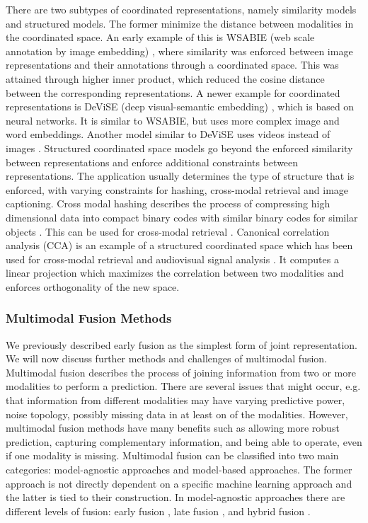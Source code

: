 \documentclass{article}
\begin{document}
There are two subtypes of coordinated representations, namely similarity models and structured models. The former minimize the distance between modalities in the coordinated space. An early example of this is WSABIE (web scale annotation by image embedding) \citep{weston2011wsabie}, where similarity was enforced between image representations and their annotations through a coordinated space. This was attained through higher inner product, which reduced the cosine distance between the corresponding representations. A newer example for coordinated representations is DeViSE (deep visual-semantic embedding) \citep{frome2013devise}, which is based on neural networks. It is similar to WSABIE, but uses more complex image and word embeddings. Another model similar to DeViSE uses videos instead of images \citep{pan2016joint}.
Structured coordinated space models go beyond the enforced similarity between representations and  enforce additional constraints between representations. The application usually determines the type of structure that is enforced, with varying constraints for hashing, cross-modal retrieval and image captioning. Cross modal hashing describes the process of compressing high dimensional data into compact binary codes with similar binary codes for similar objects \citep{wang2014hashing}. This can be used for cross-modal retrieval \citep{bronstein2010data, jiang2015class}. Canonical correlation analysis (CCA) \citep{hotelling1936relations} is an example of a structured coordinated space which has been used for cross-modal retrieval \citep{hardoon2004canonical, klein2015associating, Rasiwasia2010ANA} and audiovisual signal analysis \citep{sargin2007audio, slaney2001facesync}. It computes a linear projection which maximizes the correlation between two modalities and enforces orthogonality of the new space.

\subsubsection{Multimodal Fusion Methods}

We previously described early fusion as the simplest form of joint representation. We will now discuss further methods and challenges of multimodal fusion. Multimodal fusion describes the process of joining information from two or more modalities to perform a prediction. There are several issues that might occur, e.g. that information from different modalities may have varying predictive power, noise topology, possibly missing data in at least on of the modalities. However, multimodal fusion methods have many benefits such as allowing more robust prediction, capturing complementary information, and being able to operate, even if one modality is missing. Multimodal fusion can be classified into two main categories: model-agnostic approaches and model-based approaches. The former approach is not directly dependent on a specific machine learning approach and the latter is tied to their construction. In model-agnostic approaches there are different levels of fusion: early fusion \citep{leong2011going, bruni2011distri}, late fusion \citep{gunes2005affect, snoek2005late}, and hybrid fusion \citep{atrey2010hybrid}.
\end{document}
